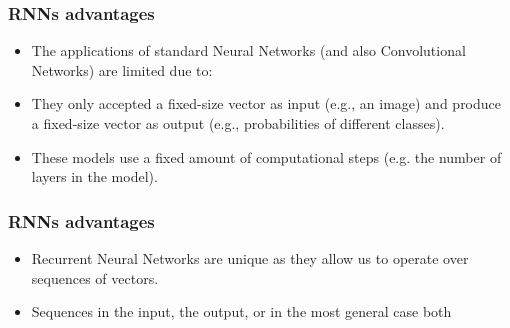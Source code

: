 \begin{frame}[fragile] \frametitle{RNNs advantages}

\begin{itemize}
\item The applications of standard Neural Networks (and also Convolutional Networks) are limited due to:
\item They only accepted a fixed-size vector as input (e.g., an image) and produce a fixed-size vector as output (e.g., probabilities of different classes). 
\item These models use a fixed amount of computational steps (e.g. the number of layers in the model).
\end{itemize}
\end{frame}


\begin{frame}[fragile] \frametitle{RNNs advantages}

\begin{itemize}
\item Recurrent Neural Networks are unique as they allow us to operate over sequences of vectors.
\item Sequences in the input, the output, or in the most general case both
\end{itemize}
\end{frame}


